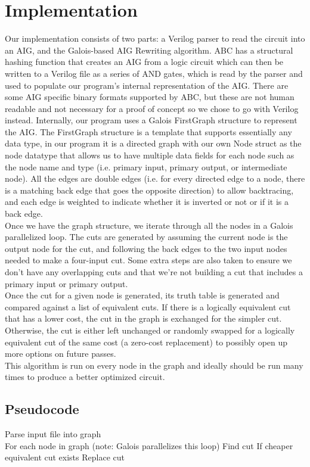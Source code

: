 \documentclass[twocolumn]{article}
\begin{document}
\section{Implementation}
Our implementation consists of two parts: a Verilog parser to read the circuit into an AIG, and the Galois-based AIG Rewriting algorithm. ABC has a structural hashing function that creates an AIG from a logic circuit which can then be written to a Verilog file as a series of AND gates, which is read by the parser and used to populate our program's internal representation of the AIG.  There are some AIG specific binary formats supported by ABC, but these are not human readable and not necessary for a proof of concept so we chose to go with Verilog instead.\newline\indent
Internally, our program uses a Galois FirstGraph structure to represent the AIG. The FirstGraph structure is a template that supports essentially any data type, in our program it is a directed graph with our own Node struct as the node datatype that allows us to have multiple data fields for each node such as the node name and type (i.e. primary input, primary output, or intermediate node).  All the edges are double edges (i.e. for every directed edge to a node, there is a matching back edge that goes the opposite direction) to allow backtracing, and each edge is weighted to indicate whether it is inverted or not or if it is a back edge.\\\indent
Once we have the graph structure, we iterate through all the nodes in a Galois parallelized loop. The cuts are generated by assuming the current node is the output node for the cut, and following the back edges to the two input nodes needed to make a four-input cut.  Some extra steps are also taken to ensure we don't have any overlapping cuts and that we're not building a cut that includes a primary input or primary output.\\\indent
Once the cut for a given node is generated, its truth table is generated and compared against a list of equivalent cuts. If there is a logically equivalent cut that has a lower cost, the cut in the graph is exchanged for the simpler cut. Otherwise, the cut is either left unchanged or randomly swapped for a logically equivalent cut of the same cost (a zero-cost replacement) to possibly open up more options on future passes.\\\indent
This algorithm is run on every node in the graph and ideally should be run many times to produce a better optimized circuit.
\subsection{Pseudocode}
Parse input file into graph\\
For each node in graph (note: Galois parallelizes this loop)\newline\indent
Find cut\newline\indent
If cheaper equivalent cut exists\newline\indent\indent
Replace cut
\end{document}
